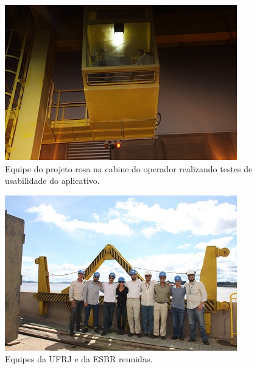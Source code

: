 \begin{figure}[h!]
  \centering
  \includegraphics[width=1\linewidth]{Fotos/Janeiro2015/20.JPG}
  \caption{Equipe do projeto rosa na cabine do operador realizando testes de
  usabilidade do aplicativo.}
  \label{jan20154}
\end{figure}

\begin{figure}[h!]
  \centering
  \includegraphics[width=1\linewidth]{Fotos/Janeiro2015/23.JPG}
  \caption{Equipes da UFRJ e da ESBR reunidas.}
  \label{jan20155}
\end{figure}

